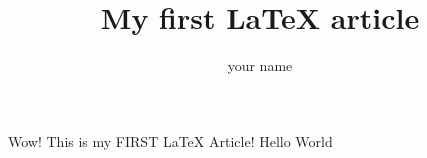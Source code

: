 \documentclass{article}
\author{your name}
\title{My first \LaTeX{} article}
\begin{document}
  \maketitle
  Wow! This is my FIRST \LaTeX{} Article!
  Hello World
\end{document}
